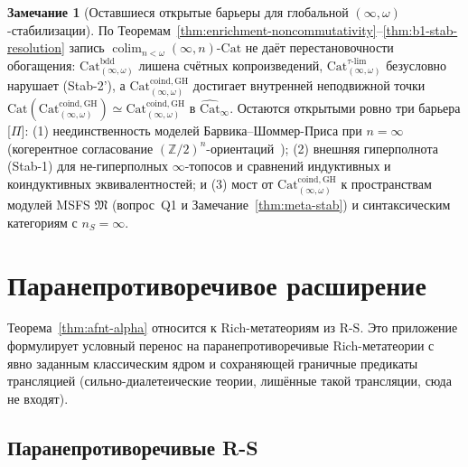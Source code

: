 \documentclass[11pt]{article}
\theoremstyle{plain}
\theoremstyle{definition}
\newtheorem{remark}[theorem]{Замечание}
\newcommand{\RS}{\mathrm{R\text{-}S}}
\newcommand{\fM}{\mathfrak{M}}
\newcommand{\Cat}{\mathrm{Cat}}
\DeclareMathOperator{\colim}{colim}
\begin{document}
\begin{remark}[Оставшиеся открытые барьеры для глобальной $(\infty, \omega)$-стабилизации]\label{thm:bergner-lurie-stab}
По Теоремам~\ref{thm:enrichment-noncommutativity}--\ref{thm:b1-stab-resolution} запись $\colim_{n < \omega} (\infty, n)\text{-}\Cat$ не даёт перестановочности обогащения: $\Cat_{(\infty,\omega)}^{\mathrm{bdd}}$ лишена счётных копроизведений, $\Cat_{(\infty,\omega)}^{\tau\text{-}\mathrm{lim}}$ безусловно нарушает \textup{(Stab-2')}, а $\Cat_{(\infty,\omega)}^{\mathrm{coind, GH}}$ достигает внутренней неподвижной точки $\Cat(\Cat_{(\infty,\omega)}^{\mathrm{coind, GH}}) \simeq \Cat_{(\infty,\omega)}^{\mathrm{coind, GH}}$ в $\widehat{\Cat}_\infty$. Остаются открытыми ровно три барьера \textup{[\textbf{$\Pi$}]}: (1) неединственность моделей Барвика--Шоммер-Приса при $n = \infty$ (когерентное согласование $(\mathbb{Z}/2)^n$-ориентаций~\cite{BarwickSchommerPries2021}); (2) внешняя гиперполнота \textup{(Stab-1)} для не-гиперполных $\infty$-топосов и сравнений индуктивных и коиндуктивных эквивалентностей; и (3) мост от $\Cat_{(\infty,\omega)}^{\mathrm{coind, GH}}$ к пространствам модулей MSFS $\fM$ (вопрос~Q1 и Замечание~\ref{thm:meta-stab}) и синтаксическим категориям с $n_S = \infty$.
\end{remark}

\section{Паранепротиворечивое расширение}\label{app:paraconsistent}

Теорема~\ref{thm:afnt-alpha} относится к Rich-метатеориям из $\RS$. Это приложение формулирует условный перенос на паранепротиворечивые Rich-метатеории с явно заданным классическим ядром и сохраняющей граничные предикаты трансляцией (сильно-диалетеические теории, лишённые такой трансляции, сюда не входят).

\subsection{Паранепротиворечивые R-S}
\end{document}
